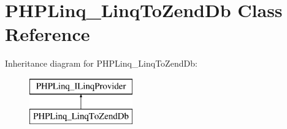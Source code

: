 \hypertarget{class_p_h_p_linq___linq_to_zend_db}{\section{\-P\-H\-P\-Linq\-\_\-\-Linq\-To\-Zend\-Db \-Class \-Reference}
\label{class_p_h_p_linq___linq_to_zend_db}
}
\-Inheritance diagram for \-P\-H\-P\-Linq\-\_\-\-Linq\-To\-Zend\-Db\-:\begin{figure}[H]
\begin{center}
\leavevmode
\includegraphics[height=2.000000cm]{class_p_h_p_linq___linq_to_zend_db}
\end{center}
\end{figure}
